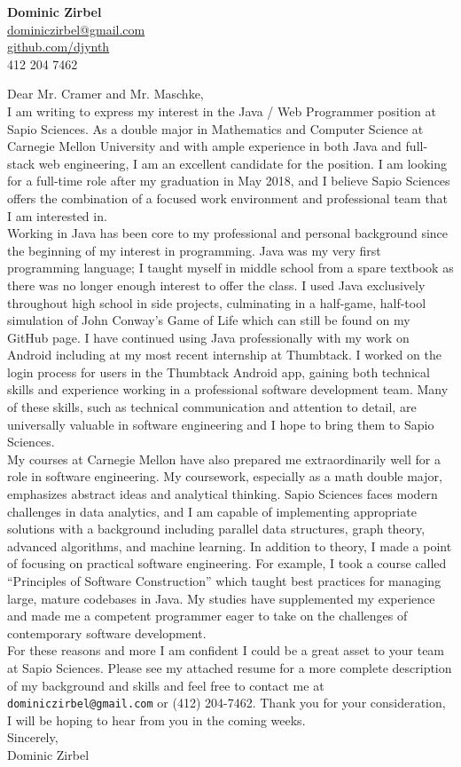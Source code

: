 \documentclass[letterpaper,10pt]{article}
\newcommand{\lb}{\vspace{14pt} \\}
\begin{document}
\thispagestyle{empty}

\begin{flushright}
    \textbf{\Large{Dominic Zirbel}} \\
    \href{mailto:dominiczirbel@gmail.com}{dominiczirbel@gmail.com} \\
    \href{https://github.com/djynth}{github.com/djynth} \\
    412 204 7462
\end{flushright}

\vspace{36pt}

Dear Mr. Cramer and Mr. Maschke,
\lb
I am writing to express my interest in the Java / Web Programmer position at Sapio Sciences. As a double major in Mathematics and Computer Science at Carnegie Mellon University and with ample experience in both Java and full-stack web engineering, I am an excellent candidate for the position. I am looking for a full-time role after my graduation in May 2018, and I believe Sapio Sciences offers the combination of a focused work environment and professional team that I am interested in.
\lb
Working in Java has been core to my professional and personal background since the beginning of my interest in programming. Java was my very first programming language; I taught myself in middle school from a spare textbook as there was no longer enough interest to offer the class. I used Java exclusively throughout high school in side projects, culminating in a half-game, half-tool simulation of John Conway's Game of Life which can still be found on my GitHub page. I have continued using Java professionally with my work on Android including at my most recent internship at Thumbtack. I worked on the login process for users in the Thumbtack Android app, gaining both technical skills and experience working in a professional software development team. Many of these skills, such as technical communication and attention to detail, are universally valuable in software engineering and I hope to bring them to Sapio Sciences.
\lb
My courses at Carnegie Mellon have also prepared me extraordinarily well for a role in software engineering. My coursework, especially as a math double major, emphasizes abstract ideas and analytical thinking. Sapio Sciences faces modern challenges in data analytics, and I am capable of implementing appropriate solutions with a background including parallel data structures, graph theory, advanced algorithms, and machine learning. In addition to theory, I made a point of focusing on practical software engineering. For example, I took a course called ``Principles of Software Construction'' which taught best practices for managing large, mature codebases in Java. My studies have supplemented my experience and made me a competent programmer eager to take on the challenges of contemporary software development.
\lb
For these reasons and more I am confident I could be a great asset to your team at Sapio Sciences. Please see my attached resume for a more complete description of my background and skills and feel free to contact me at \texttt{dominiczirbel@gmail.com} or (412) 204-7462. Thank you for your consideration, I will be hoping to hear from you in the coming weeks.
\lb
Sincerely, \\
Dominic Zirbel
\end{document}
